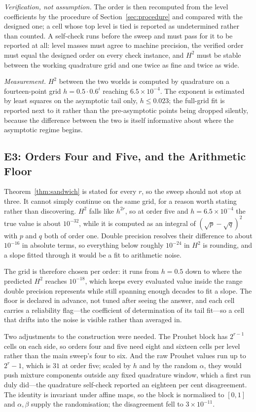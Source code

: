 \documentclass[conference]{IEEEtran}
\theoremstyle{definition}
\begin{document}
\emph{Verification, not assumption.} The order is then recomputed from the level coefficients
by the procedure of Section~\ref{sec:procedure} and compared with the designed one; a cell
whose top level is tied is reported as undetermined rather than counted. A self-check runs
before the sweep and must pass for it to be reported at all: level masses must agree to
machine precision, the verified order must equal the designed order on every check instance,
and $H^{2}$ must be stable between the working quadrature grid and one twice as fine and
twice as wide.

\emph{Measurement.} $H^{2}$ between the two worlds is computed by quadrature on a
fourteen-point grid $h=0.5\cdot0.6^{i}$ reaching $6.5\times10^{-4}$. The exponent is
estimated by least squares on the asymptotic tail only, $h\le0.023$; the full-grid fit is
reported next to it rather than the pre-asymptotic points being dropped silently, because the
difference between the two is itself informative about where the asymptotic regime begins.

\subsection{E3: Orders Four and Five, and the Arithmetic Floor}
\label{sec:e3}

Theorem~\ref{thm:sandwich} is stated for every $r$, so the sweep should not stop at three. It
cannot simply continue on the same grid, for a reason worth stating rather than discovering.
$H^{2}$ falls like $h^{2r}$, so at order five and $h=6.5\times10^{-4}$ the true value is
about $10^{-32}$, while it is computed as an integral of
$(\sqrt{p}-\sqrt{q})^{2}$ with $p$ and $q$ both of order one. Double precision resolves their
difference to about $10^{-16}$ in absolute terms, so everything below roughly $10^{-24}$ in
$H^{2}$ is rounding, and a slope fitted through it would be a fit to arithmetic noise.

The grid is therefore chosen per order: it runs from $h=0.5$ down to where the predicted
$H^{2}$ reaches $10^{-18}$, which keeps every evaluated value inside the range double
precision represents while still spanning enough decades to fit a slope. The floor is
declared in advance, not tuned after seeing the answer, and each cell carries a reliability
flag---the coefficient of determination of its tail fit---so a cell that drifts into the
noise is visible rather than averaged in.

Two adjustments to the construction were needed. The Prouhet block has $2^{r-1}$ cells on
each side, so orders four and five need eight and sixteen cells per level rather than the
main sweep's four to six. And the raw Prouhet values run up to $2^{r}-1$, which is $31$ at
order five; scaled by $h$ and by the random $\alpha$, they would push mixture components
outside any fixed quadrature window, which a first run duly did---the quadrature self-check
reported an eighteen per cent disagreement. The identity is invariant under affine maps, so
the block is normalised to $[0,1]$ and $\alpha,\beta$ supply the randomisation; the
disagreement fell to $3\times10^{-11}$.
\end{document}
